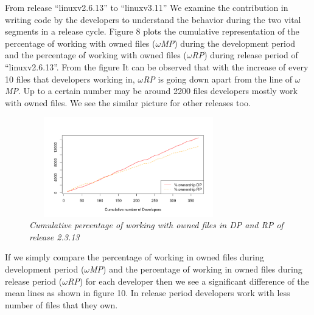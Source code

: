 \documentclass{acm_proc_article-sp}
\begin{document}
From release ``linuxv2.6.13'' to ``linuxv3.11'' We examine the contribution in writing code by the developers to understand the behavior during the two vital segments in a release cycle. Figure 8 plots the cumulative representation of the percentage of working with owned files ($\omega$\textit{MP}) during the development period and the percentage of working with owned files ($\omega$\textit{RP}) during release period of ``linuxv2.6.13''. From the figure It can be observed that with the increase of every 10 files that developers working in, $\omega$\textit{RP} is going down apart from the line of $\omega$\textit{MP}. Up to a certain number may be around 2200 files developers mostly work with owned files. We see the similar picture for other releases too.
\begin{figure}
\begin{center}
\includegraphics[height=1.7in,width=3.4in]{cumulFileOwnP.png}
\caption{\small \sl Cumulative percentage of working with owned files in DP and RP of release 2.3.13}
\end{center}
\end{figure}

If we simply compare the percentage of working in owned files during development period ($\omega$\textit{MP}) and the percentage of working in owned files during release period ($\omega$\textit{RP}) for each developer then we see a significant difference of the mean lines as shown in figure 10. In release period developers work with less number of files that they own.
\end{document}
